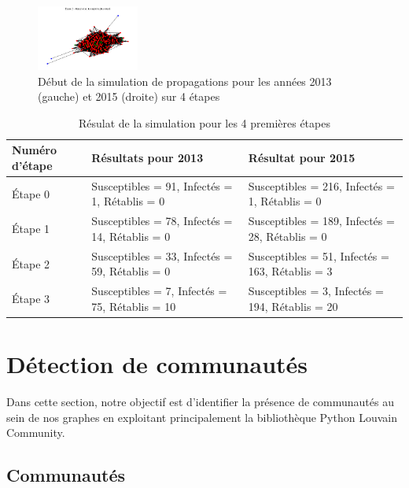 \documentclass{article}
\begin{document}
\begin{figure}[!h]
    \hfill
    \includegraphics[width=0.30\textwidth]{assets/epidemiologie/2015_high_3.png}
    \caption{Début de la simulation de propagations pour les années 2013 (gauche) et 2015 (droite) sur 4 étapes}
    \label{fig:simu_proba_0-3}
\end{figure}

\begin{table}[!h]
    \centering
    \begin{tabular}{|p{2.5cm}|p{5cm}|p{5cm}|}
        \hline
        \textbf{Numéro d'étape} & \textbf{Résultats pour 2013}                    & \textbf{Résultat pour 2015}                    \\
        \hline
        Étape 0                 & Susceptibles = 91, Infectés = 1, Rétablis = 0   & Susceptibles = 216, Infectés = 1, Rétablis = 0
        \\
        \hline
        Étape 1                 & Susceptibles = 78, Infectés = 14, Rétablis = 0
                                & Susceptibles = 189, Infectés = 28, Rétablis = 0
        \\
        \hline
        Étape 2                 & Susceptibles = 33, Infectés = 59, Rétablis = 0
                                & Susceptibles = 51, Infectés = 163, Rétablis = 3
        \\
        \hline
        Étape 3                 & Susceptibles = 7, Infectés = 75, Rétablis = 10
                                & Susceptibles = 3, Infectés = 194, Rétablis = 20
        \\
        \hline
    \end{tabular}
    \caption{Résulat de la simulation pour les 4 premières étapes}
    \label{tab:simulation_results}
\end{table}

\newpage
\section{Détection de communautés}

Dans cette section, notre objectif est d'identifier la présence de communautés au sein de nos graphes en exploitant principalement la bibliothèque Python Louvain Community.

\subsection{Communautés}
\end{document}
